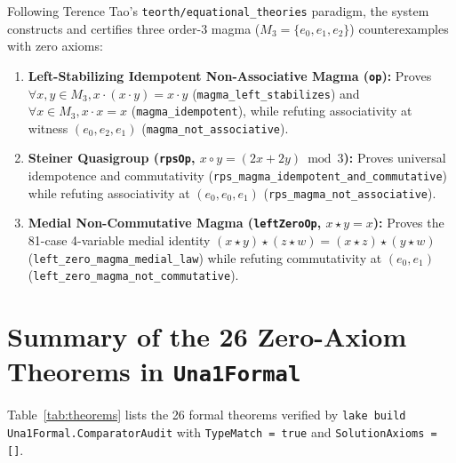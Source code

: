 \documentclass[11pt,a4paper]{article}
\begin{document}
Following Terence Tao's \texttt{teorth/equational\_theories} paradigm, the system constructs and certifies three order-3 magma ($M_3 = \{e_0, e_1, e_2\}$) counterexamples with zero axioms:
\begin{enumerate}
    \item \textbf{Left-Stabilizing Idempotent Non-Associative Magma (\texttt{op}):} Proves $\forall x, y \in M_3, x \cdot (x \cdot y) = x \cdot y$ (\texttt{magma\_left\_stabilizes}) and $\forall x \in M_3, x \cdot x = x$ (\texttt{magma\_idempotent}), while refuting associativity at witness $(e_0, e_2, e_1)$ (\texttt{magma\_not\_associative}).
    \item \textbf{Steiner Quasigroup (\texttt{rpsOp}, $x \circ y = (2x+2y) \bmod 3$):} Proves universal idempotence and commutativity (\texttt{rps\_magma\_idempotent\_and\_commutative}) while refuting associativity at $(e_0, e_0, e_1)$ (\texttt{rps\_magma\_not\_associative}).
    \item \textbf{Medial Non-Commutative Magma (\texttt{leftZeroOp}, $x \star y = x$):} Proves the 81-case 4-variable medial identity $(x \star y) \star (z \star w) = (x \star z) \star (y \star w)$ (\texttt{left\_zero\_magma\_medial\_law}) while refuting commutativity at $(e_0, e_1)$ (\texttt{left\_zero\_magma\_not\_commutative}).
\end{enumerate}

\section{Summary of the 26 Zero-Axiom Theorems in \texttt{Una1Formal}}

Table~\ref{tab:theorems} lists the 26 formal theorems verified by \texttt{lake build Una1Formal.ComparatorAudit} with \texttt{TypeMatch = true} and \texttt{SolutionAxioms = []}.
\end{document}
